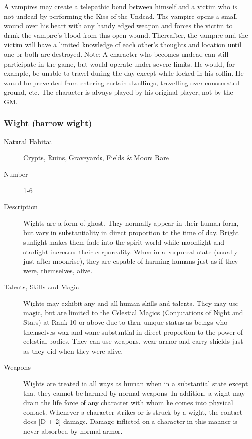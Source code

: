 \begin{multicols*}{2}
\begin{description}
A vampires may create a telepathic bond between himself and a victim
who is not undead by performing the Kiss of the Undead.  The vampire
opens a small wound over his heart with any handy edged weapon and
forces the victim to drink the vampire's blood from this open
wound. Thereafter, the vampire and the victim will have a limited
knowledge of each other's thoughts and location until one or both are
destroyed.  Note: A character who becomes undead can still participate
in the game, but would operate under severe limits. He would, for
example, be unable to travel during the day except while locked in his
coffin. He would be prevented from entering certain dwellings,
travelling over consecrated ground, etc. The character is always
played by his original player, not by the GM.

\end{description}

\subsubsection{Wight (barrow wight)}

\begin{description}
\item[Natural Habitat]  Crypts, Ruins, Graveyards, Fields \& Moors Rare

\item[Number] 1-6

\item[Description] Wights are a form of ghost. They normally appear in
their human form, but vary in substantiality in direct proportion to
the time of day. Bright sunlight makes them fade into the spirit world
while moonlight and starlight increases their corporeality. When in a
corporeal state (usually just after moonrise), they are capable of
harming humans just as if they were, themselves, alive.

\item[Talents, Skills and Magic] Wights may exhibit any and all human skills and talents.
They may use magic, but are limited to the Celestial Magics
(Conjurations of Night and Stars) at Rank 10 or above due to their
unique status as beings who themselves wax and wane substantial in
direct proportion to the power of celestial bodies. They can use
weapons, wear armor and carry shields just as they did when they were
alive.

\item[Weapons] Wights are treated in all ways as human when in a
substantial state except that they cannot be harmed by normal
weapons. In addition, a wight may drain the life force of any
character with whom he comes into physical contact. Whenever a
character strikes or is struck by a wight, the contact does [D + 2]
damage. Damage inflicted on a character in this manner is never
absorbed by normal armor.


\end{description}
\end{multicols*}
